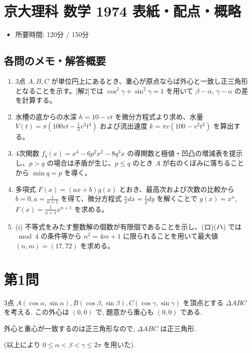 \documentclass[../main.tex]{subfiles}
\begin{document}
\section*{京大理科 数学 1974 表紙・配点・概略}

\begin{itemize}
  \item 所要時間: 120分 / 150分
\end{itemize}

\subsection*{各問のメモ・解答概要}
\begin{enumerate}
  \item 3点 $A, B, C$ が単位円上にあるとき、重心が原点ならば外心と一致し正三角形となることを示す。[解2]では $\cos^2\gamma + \sin^2\gamma = 1$ を用いて $\beta - \alpha$, $\gamma - \alpha$ の差を計算する。
  \item 水槽の底からの水深 $h = 10 - vt$ を微分方程式より求め、水量 $V(t) = \pi \left( 100vt - \frac{1}{3}v^3 t^3 \right)$ および流出速度 $k = \pi v (100 - v^2 t^2)$ を算出する。
  \item 4次関数 $f_q(x) = x^4 - 6p^2 x^2 - 8q^3 x$ の導関数と極値・凹凸の増減表を提示し、$p > q$ の場合は矛盾が生じ、$p \le q$ のとき $A$ が右のくぼみに落ちることから $\min q = p$ を導く。
  \item 多項式 $F(x) = (ax+b)g(x)$ とおき、最高次および次数の比較から $b=0, a=\frac{1}{n+1}$ を得て、微分方程式 $\frac{n}{x}dx = \frac{1}{y}dy$ を解くことで $g(x) = x^n$, $F(x) = \frac{1}{n+1}x^{n+1}$ を求める。
  \item (i) 不等式をみたす整数解の個数が有限個であることを示し、(ロ)(ハ) では $\bmod 4$ の条件等から $n^2 = 4m+1$ に限られることを用いて最大値 $(n, m) = (17, 72)$ を求める。
\end{enumerate}

\newpage

\section*{第1問}

\noindent
[\textbf{解}] 3点 $A(\cos\alpha, \sin\alpha), B(\cos\beta, \sin\beta), C(\cos\gamma, \sin\gamma)$ を頂点とする $\Delta ABC$ を考える. この外心は $(0,0)$ で, 題意から重心も $(0,0)$ である.

外心と重心が一致するのは正三角形なので, $\Delta ABC$ は正三角形.

(以上により $0 \le \alpha < \beta < \gamma \le 2\pi$ を用いた).
\end{document}
